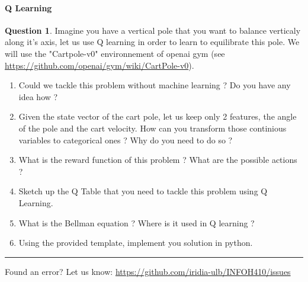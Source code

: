 \documentclass[11pt,a4paper]{article}
\theoremstyle{definition}%
\newtheorem{Q}{Question}[] %
\begin{document}
\paragraph{Q Learning}
\begin{Q}
Imagine you have a vertical pole that you want to balance verticaly along it's axis,
let us use Q learning in order to learn to equilibrate this pole. We will use the "Cartpole-v0"
environnement of openai gym (see \url{https://github.com/openai/gym/wiki/CartPole-v0}).

\begin{enumerate}
    \item Could we tackle this problem without machine learning ? Do you have any idea how ?
    \item Given the state vector of the cart pole, let us keep only 2 features, the angle of the
        pole and the cart velocity. How can you transform those continious variables to
        categorical ones ? Why do you need to do so ?
    \item What is the reward function of this problem ? What are the possible actions ?
    \item Sketch up the Q Table that you need to tackle this problem using Q Learning.
    \item What is the Bellman equation ? Where is it used in Q learning ?
    \item Using the provided template, implement you solution in python. 

\end{enumerate}


\end{Q}

\noindent
\rule{\textwidth}{0.4pt}
\footnotesize{Found an error? Let us know: \url{https://github.com/iridia-ulb/INFOH410/issues}}
\end{document}
